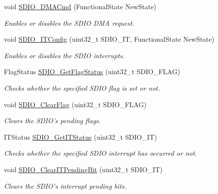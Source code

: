 \begin{DoxyCompactItemize}
void \hyperlink{group___s_d_i_o_gad36fde5ec0ce0c2089b9d971c2271e6e}{S\-D\-I\-O\-\_\-\-D\-M\-A\-Cmd} (Functional\-State New\-State)
\begin{DoxyCompactList}\small\item\em Enables or disables the S\-D\-I\-O D\-M\-A request. \end{DoxyCompactList}\item 
void \hyperlink{group___s_d_i_o_ga208f51237ef43288735829dbaed37f00}{S\-D\-I\-O\-\_\-\-I\-T\-Config} (uint32\-\_\-t S\-D\-I\-O\-\_\-\-I\-T, Functional\-State New\-State)
\begin{DoxyCompactList}\small\item\em Enables or disables the S\-D\-I\-O interrupts. \end{DoxyCompactList}\item 
Flag\-Status \hyperlink{group___s_d_i_o_ga644514b4b3c95c5c4326d99cd166f6f9}{S\-D\-I\-O\-\_\-\-Get\-Flag\-Status} (uint32\-\_\-t S\-D\-I\-O\-\_\-\-F\-L\-A\-G)
\begin{DoxyCompactList}\small\item\em Checks whether the specified S\-D\-I\-O flag is set or not. \end{DoxyCompactList}\item 
void \hyperlink{group___s_d_i_o_ga7aff4efdeb528229135f9f285e53518a}{S\-D\-I\-O\-\_\-\-Clear\-Flag} (uint32\-\_\-t S\-D\-I\-O\-\_\-\-F\-L\-A\-G)
\begin{DoxyCompactList}\small\item\em Clears the S\-D\-I\-O's pending flags. \end{DoxyCompactList}\item 
I\-T\-Status \hyperlink{group___s_d_i_o_ga2d64af1f3df0f99cb518f9a89bbd02ac}{S\-D\-I\-O\-\_\-\-Get\-I\-T\-Status} (uint32\-\_\-t S\-D\-I\-O\-\_\-\-I\-T)
\begin{DoxyCompactList}\small\item\em Checks whether the specified S\-D\-I\-O interrupt has occurred or not. \end{DoxyCompactList}\item 
void \hyperlink{group___s_d_i_o_ga048e07fd86321cd01b2a22c071c3149b}{S\-D\-I\-O\-\_\-\-Clear\-I\-T\-Pending\-Bit} (uint32\-\_\-t S\-D\-I\-O\-\_\-\-I\-T)
\begin{DoxyCompactList}\small\item\em Clears the S\-D\-I\-O's interrupt pending bits. \end{DoxyCompactList}\end{DoxyCompactItemize}


